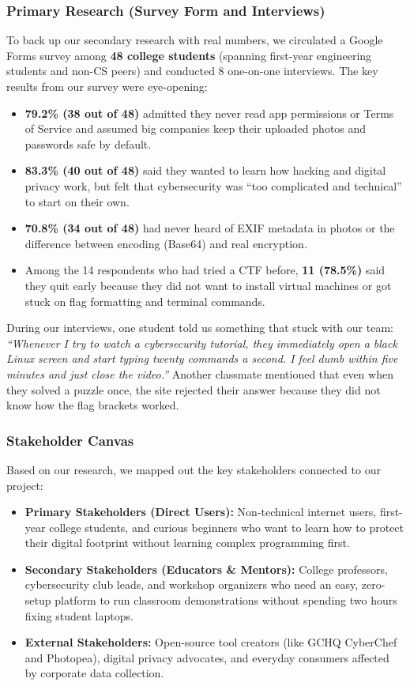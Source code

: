 \documentclass[11pt,a4paper]{article}
\begin{document}
\subsubsection{Primary Research (Survey Form and Interviews)}
To back up our secondary research with real numbers, we circulated a Google Forms survey among \textbf{48 college students} (spanning first-year engineering students and non-CS peers) and conducted 8 one-on-one interviews. The key results from our survey were eye-opening:
\begin{itemize}
    \item \textbf{79.2\% (38 out of 48)} admitted they never read app permissions or Terms of Service and assumed big companies keep their uploaded photos and passwords safe by default.
    \item \textbf{83.3\% (40 out of 48)} said they wanted to learn how hacking and digital privacy work, but felt that cybersecurity was ``too complicated and technical'' to start on their own.
    \item \textbf{70.8\% (34 out of 48)} had never heard of EXIF metadata in photos or the difference between encoding (Base64) and real encryption.
    \item Among the 14 respondents who had tried a CTF before, \textbf{11 (78.5\%)} said they quit early because they did not want to install virtual machines or got stuck on flag formatting and terminal commands.
\end{itemize}

During our interviews, one student told us something that stuck with our team: \textit{``Whenever I try to watch a cybersecurity tutorial, they immediately open a black Linux screen and start typing twenty commands a second. I feel dumb within five minutes and just close the video.''} Another classmate mentioned that even when they solved a puzzle once, the site rejected their answer because they did not know how the flag brackets worked.

\subsubsection{Stakeholder Canvas}
Based on our research, we mapped out the key stakeholders connected to our project:
\begin{itemize}
    \item \textbf{Primary Stakeholders (Direct Users):} Non-technical internet users, first-year college students, and curious beginners who want to learn how to protect their digital footprint without learning complex programming first.
    \item \textbf{Secondary Stakeholders (Educators \& Mentors):} College professors, cybersecurity club leads, and workshop organizers who need an easy, zero-setup platform to run classroom demonstrations without spending two hours fixing student laptops.
    \item \textbf{External Stakeholders:} Open-source tool creators (like GCHQ CyberChef and Photopea), digital privacy advocates, and everyday consumers affected by corporate data collection.
\end{itemize}
\end{document}
